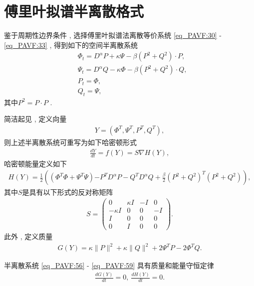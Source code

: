 \section{傅里叶拟谱半离散格式}\label{Section_PAVF: 2_2}

鉴于周期性边界条件 , 选择傅里叶拟谱法离散等价系统 \eqref{eq_PAVF:30} - \eqref{eq_PAVF:33} , 
得到如下的空间半离散系统
\begin{align}
&\varPhi_{t}=D^{\alpha}P+\kappa \Psi-\beta \left( P^{2}+Q^{2}\right)\cdot P , \label{eq_PAVF:56}\\
&\Psi_{t}=D^{\alpha}Q-\kappa \varPhi-\beta \left( P^{2}+Q^{2}\right)\cdot Q , \label{eq_PAVF:57}\\
&P_t=\varPhi , \label{eq_PAVF:58}\\
&Q_t=\Psi , \label{eq_PAVF:59}
\end{align}
其中$P^{2}=P \cdot P$ . 

简洁起见 , 定义向量
\begin{align}\label{eq_PAVF:60a}
Y=\left(\varPhi^{T} , \Psi^{T} , P^{T} , Q^{T}\right) , 
\end{align}
则上述半离散系统可重写为如下哈密顿形式
\begin{align}\label{eq_PAVF:60}
\frac{d Y}{d t}=f(Y)=S \nabla H(Y) , 
\end{align}
哈密顿能量定义如下
\begin{align}\label{eq_PAVF:61}
	H(Y)=\frac{1}{2}\left((\varPhi^{T}\varPhi+\Psi^{T}\Psi){-P^{T} D^{\alpha} P-Q^{T} D^{\alpha} Q}+\frac{\beta}{2}(P^2+Q^2)^{T}(P^2+Q^2)\right) , 
\end{align}
其中$S$是具有以下形式的反对称矩阵
\begin{align}\label{eq_PAVF:62}
S=\left(\begin{array}{cccc}
0 & \kappa I & -I & 0 \\
-\kappa I & 0 & 0 & -I \\
I & 0 & 0 & 0 \\
0 & I & 0 & 0
\end{array}\right) . 
\end{align}
此外 , 定义质量
\begin{align}\label{eq_PAVF:63}
G(Y)=\kappa\|P\|^{2}+\kappa\|Q\|^{2} +2\Psi^{T}P-2\varPhi^{T}Q . 
\end{align}

\begin{theorem}	\label{thm_PAVF:3}
	半离散系统 \eqref{eq_PAVF:56} - \eqref{eq_PAVF:59} 具有质量和能量守恒定律
\begin{align}
\frac{d G(Y)}{d t}=0 , ~\frac{d H(Y)}{d t}=0 . 
\end{align}
\end{theorem}

